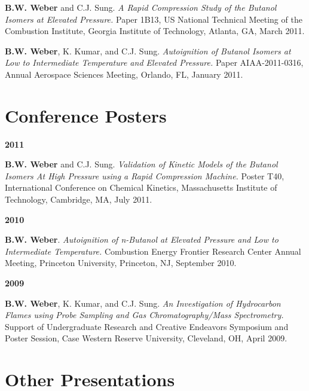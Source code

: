 \begin{bibsection}
\item[] \textbf{B.W. Weber} and C.J. Sung. \textit{A Rapid Compression
        Study of the Butanol Isomers at Elevated Pressure.} Paper 1B13,
          US National Technical Meeting of the Combustion
        Institute, Georgia Institute of Technology, Atlanta, GA, March
        2011.

\item[] \textbf{B.W. Weber}, K. Kumar, and C.J. Sung.
        \textit{Autoignition of Butanol Isomers at Low to Intermediate
        Temperature and Elevated Pressure.} Paper AIAA-2011-0316,
          Annual Aerospace Sciences Meeting,
        Orlando, FL, January 2011.
\end{bibsection}

\section{{\sectionfont Conference Posters}}

\begin{bibsection}
\item[] \textbf{2011}
\item[] \textbf{B.W. Weber} and C.J. Sung. \textit{Validation of
        Kinetic Models of the Butanol Isomers At High Pressure
        using a Rapid Compression Machine.} Poster T40,
         International Conference on Chemical Kinetics,
         Massachusetts Institute of Technology, Cambridge, MA,
         July 2011.

\item[] \textbf{2010}
\item[] \textbf{B.W. Weber}. \textit{Autoignition of n-Butanol at
        Elevated Pressure and Low to Intermediate Temperature.}
         Combustion Energy Frontier Research Center
        Annual Meeting, Princeton University, Princeton, NJ,
        September 2010.

\item[] \textbf{2009}
\item[] \textbf{B.W. Weber}, K. Kumar, and C.J. Sung. \textit{An
        Investigation of Hydrocarbon Flames using Probe Sampling and
        Gas Chromatography/Mass Spectrometry.} Support of Undergraduate
        Research and Creative Endeavors Symposium and Poster Session,
        Case Western Reserve University, Cleveland, OH, April 2009.
\end{bibsection}

\section{{\sectionfont Other Presentations}}

